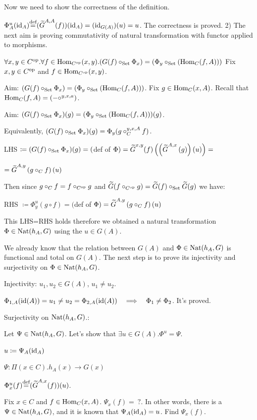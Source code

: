 \documentclass[10pt,a4paper]{article}
\begin{document}
Now we need to show the correctness of the definition.

$\Phi^u_A({\textrm{id}}_A){\stackrel{{\textrm{def}}}{=}} ({\widetilde{G}\textrm{}}^{A,A}(f))({\textrm{id}}_A) = ({\textrm{id}}_{G(A)})(u) = u$. The correctness is proved.
2) The next aim is proving commutativity of natural transformation with functor applied to morphisms.

$\forall x,y\in C^{\textrm{op}}.\forall f\in {\textrm{Hom}}_{C^{\textrm{op}}}(x,y).(G(f)\circ_{\textrm{Set}} \Phi_x) = (\Phi_y \circ_{\textrm{Set}} ({\textrm{Hom}}_C(f,A)))$
Fix  $x,y\in C^{\textrm{op}}$ and $f\in {\textrm{Hom}}_{C^{\textrm{op}}}(x,y)$.

Aim: $(G(f)\circ_{\textrm{Set}} \Phi_x) = (\Phi_y \circ_{\textrm{Set}} ({\textrm{Hom}}_C(f,A)))$.
Fix $g\in {\textrm{Hom}}_C(x,A)$. Recall that ${\textrm{Hom}}_C(f,A)=(-\circ^{y,x,a})$.

Aim: $(G(f)\circ_{\textrm{Set}} \Phi_x)(g) = (\Phi_y \circ_{\textrm{Set}} ({\textrm{Hom}}_C(f,A)))(g)$.

Equivalently, $(G(f)\circ_{\textrm{Set}} \Phi_x)(g) = \Phi_y (g\circ_C^{y,x,A} f)$.

LHS $\coloneqq (G(f)\circ_{\textrm{Set}} \Phi_x)(g) =($def of $\Phi)= {\widetilde{G}\textrm{}}^{x,y}(f)\left(\left({\widetilde{G}\textrm{}}^{A,x}\left(g\right)\right)\left(u\right)\right) =$

$ ={\widetilde{G}\textrm{}}^{A,y}\left(g\circ_C f\right)(u)$

Then since $g\circ_C f = f\circ_{C^{\textrm{op}}} g$ and ${\widetilde{G}\textrm{}}(f\circ_{C^{\textrm{op}}} g)=  {\widetilde{G}\textrm{}}(f)\circ_{\textrm{Set}} {\widetilde{G}\textrm{}}(g)$ we have:

RHS $\coloneqq \Phi^u_y(g\circ f)=($def of $\Phi)={\widetilde{G}\textrm{}}^{A,y}\left(g\circ_C f\right)(u)$

This LHS=RHS holds therefore we obtained a natural transformation $\Phi\in{\textrm{Nat}}(h_A,G)$ using the $u\in G(A)$.

We already know that the relation between $G(A)$ and $\Phi\in{\textrm{Nat}}(h_A,G)$ is functional and total on $G(A)$.
The next step is to prove its injectivity and surjectivity on $\Phi\in{\textrm{Nat}}(h_A,G)$.

Injectivity: $u_1,u_2\in G(A)$, $u_1\neq u_2$.

$\Phi_{1,A}({\textrm{id}}(A))= u_1\neq u_2 = \Phi_{2,A}({\textrm{id}}(A))\quad \Longrightarrow \quad \Phi_1 \neq \Phi_2$. It's proved. 

Surjectivity on ${\textrm{Nat}}(h_A,G)$.:

Let $\Psi\in{\textrm{Nat}}(h_A,G)$. Let's show that $\exists u\in G(A).\Phi^u=\Psi$.

$u\coloneqq \Psi_A({\textrm{id}}_A)$

$\Psi:\Pi(x\in C). h_A(x)\to G(x)$

$\Phi^u_x(f) {\stackrel{{\textrm{def}}}{=}} ({\widetilde{G}\textrm{}}^{A,x}(f))(u)$.

Fix $x\in C$ and $f\in{\textrm{Hom}}_C(x,A)$. $\Psi_x(f)=\ ?$.
In other words, there is a $\Psi\in{\textrm{Nat}}(h_A,G)$, and it is known that $\Psi_A({\textrm{id}}_A) = u$. Find $\Psi_x(f)$.
\end{document}
